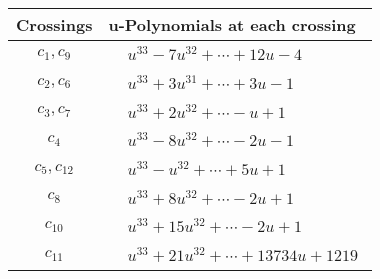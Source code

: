 \documentclass[1p]{elsarticle_modified}
\theoremstyle{definition}
\begin{document}
\begin{tabular}{m{50pt}|m{274pt}}
Crossings & \hspace{64pt}u-Polynomials at each crossing \\
\hline $$\begin{aligned}c_{1},c_{9}\end{aligned}$$&$\begin{aligned}
&u^{33}-7 u^{32}+\cdots+12 u-4
\end{aligned}$\\
\hline $$\begin{aligned}c_{2},c_{6}\end{aligned}$$&$\begin{aligned}
&u^{33}+3 u^{31}+\cdots+3 u-1
\end{aligned}$\\
\hline $$\begin{aligned}c_{3},c_{7}\end{aligned}$$&$\begin{aligned}
&u^{33}+2 u^{32}+\cdots- u+1
\end{aligned}$\\
\hline $$\begin{aligned}c_{4}\end{aligned}$$&$\begin{aligned}
&u^{33}-8 u^{32}+\cdots-2 u-1
\end{aligned}$\\
\hline $$\begin{aligned}c_{5},c_{12}\end{aligned}$$&$\begin{aligned}
&u^{33}- u^{32}+\cdots+5 u+1
\end{aligned}$\\
\hline $$\begin{aligned}c_{8}\end{aligned}$$&$\begin{aligned}
&u^{33}+8 u^{32}+\cdots-2 u+1
\end{aligned}$\\
\hline $$\begin{aligned}c_{10}\end{aligned}$$&$\begin{aligned}
&u^{33}+15 u^{32}+\cdots-2 u+1
\end{aligned}$\\
\hline $$\begin{aligned}c_{11}\end{aligned}$$&$\begin{aligned}
&u^{33}+21 u^{32}+\cdots+13734 u+1219
\end{aligned}$\\
\hline
\end{tabular}\\~\\
\end{document}
